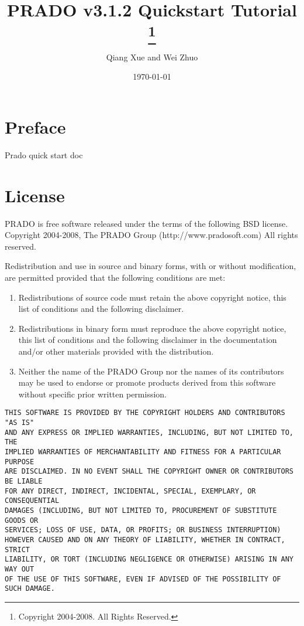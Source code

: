 \documentclass{book}
\title{\Huge \bfseries PRADO v3.1.2 Quickstart Tutorial
    \thanks{Copyright 2004-2008. All Rights Reserved.}
}
\author{Qiang Xue and Wei Zhuo}
\date{\today}
\begin{document}
\maketitle

\pagestyle{plain}
\tableofcontents

\chapter*{Preface}
Prado quick start doc

\chapter*{License}
PRADO is free software released under the terms of the following BSD license.\\
Copyright 2004-2008, The PRADO Group (http://www.pradosoft.com)
All rights reserved.

Redistribution and use in source and binary forms, with or without
modification, are permitted provided that the following conditions are met:
\begin{enumerate}
	\item Redistributions of source code must retain the above copyright notice,
this list of conditions and the following disclaimer.

 \item Redistributions in binary form must reproduce the above copyright notice,
this list of conditions and the following disclaimer in the documentation
and/or other materials provided with the distribution.

\item Neither the name of the PRADO Group nor the names of its contributors may
be used to endorse or promote products derived from this software without
specific prior written permission.
\end{enumerate}

\begin{verbatim}
THIS SOFTWARE IS PROVIDED BY THE COPYRIGHT HOLDERS AND CONTRIBUTORS "AS IS"
AND ANY EXPRESS OR IMPLIED WARRANTIES, INCLUDING, BUT NOT LIMITED TO, THE
IMPLIED WARRANTIES OF MERCHANTABILITY AND FITNESS FOR A PARTICULAR PURPOSE
ARE DISCLAIMED. IN NO EVENT SHALL THE COPYRIGHT OWNER OR CONTRIBUTORS BE LIABLE
FOR ANY DIRECT, INDIRECT, INCIDENTAL, SPECIAL, EXEMPLARY, OR CONSEQUENTIAL
DAMAGES (INCLUDING, BUT NOT LIMITED TO, PROCUREMENT OF SUBSTITUTE GOODS OR
SERVICES; LOSS OF USE, DATA, OR PROFITS; OR BUSINESS INTERRUPTION)
HOWEVER CAUSED AND ON ANY THEORY OF LIABILITY, WHETHER IN CONTRACT, STRICT
LIABILITY, OR TORT (INCLUDING NEGLIGENCE OR OTHERWISE) ARISING IN ANY WAY OUT
OF THE USE OF THIS SOFTWARE, EVEN IF ADVISED OF THE POSSIBILITY OF SUCH DAMAGE.
\end{verbatim}
\end{document}
